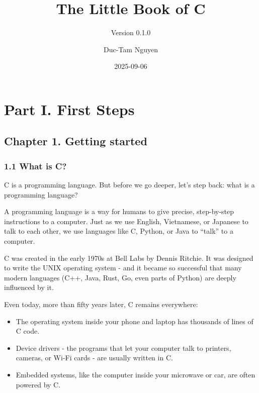 \documentclass[
  letterpaper,
  DIV=11,
  numbers=noendperiod]{scrreprt}
\title{The Little Book of C}
\subtitle{Version 0.1.0}
\author{Duc-Tam Nguyen}
\date{2025-09-06}
\providecommand{\tightlist}{%
  \setlength{\itemsep}{0pt}\setlength{\parskip}{0pt}}
\renewcommand*\contentsname{Table of contents}
\newcommand\contentsname{Table of contents}
\begin{document}
\maketitle

\renewcommand*\contentsname{Table of contents}
{
\hypersetup{linkcolor=}
\setcounter{tocdepth}{2}
\tableofcontents
}


\chapter{Part I. First Steps}\label{part-i.-first-steps}

\section{Chapter 1. Getting started}\label{chapter-1.-getting-started}

\subsection{1.1 What is C?}\label{what-is-c}

C is a programming language. But before we go deeper, let's step back:
what is a programming language?

A programming language is a way for humans to give precise, step-by-step
instructions to a computer. Just as we use English, Vietnamese, or
Japanese to talk to each other, we use languages like C, Python, or Java
to ``talk'' to a computer.

C was created in the early 1970s at Bell Labs by Dennis Ritchie. It was
designed to write the UNIX operating system - and it became so
successful that many modern languages (C++, Java, Rust, Go, even parts
of Python) are deeply influenced by it.

Even today, more than fifty years later, C remains everywhere:

\begin{itemize}
\tightlist
\item
  The operating system inside your phone and laptop has thousands of
  lines of C code.
\item
  Device drivers - the programs that let your computer talk to printers,
  cameras, or Wi-Fi cards - are usually written in C.
\item
  Embedded systems, like the computer inside your microwave or car, are
  often powered by C.
\end{itemize}
\end{document}
